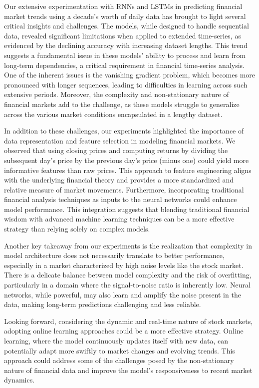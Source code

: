 \documentclass[10pt,twocolumn,letterpaper]{article}
\begin{document}
Our extensive experimentation with RNNs and LSTMs in predicting financial market trends using a decade's worth of daily data has brought to light several critical insights and challenges. The models, while designed to handle sequential data, revealed significant limitations when applied to extended time-series, as evidenced by the declining accuracy with increasing dataset lengths. This trend suggests a fundamental issue in these models' ability to process and learn from long-term dependencies, a critical requirement in financial time-series analysis. One of the inherent issues is the vanishing gradient problem, which becomes more pronounced with longer sequences, leading to difficulties in learning across such extensive periods. Moreover, the complexity and non-stationary nature of financial markets add to the challenge, as these models struggle to generalize across the various market conditions encapsulated in a lengthy dataset.

In addition to these challenges, our experiments highlighted the importance of data representation and feature selection in modeling financial markets. We observed that using closing prices and computing returns by dividing the subsequent day's price by the previous day's price (minus one) could yield more informative features than raw prices. This approach to feature engineering aligns with the underlying financial theory and provides a more standardized and relative measure of market movements. Furthermore, incorporating traditional financial analysis techniques as inputs to the neural networks could enhance model performance. This integration suggests that blending traditional financial wisdom with advanced machine learning techniques can be a more effective strategy than relying solely on complex models.

Another key takeaway from our experiments is the realization that complexity in model architecture does not necessarily translate to better performance, especially in a market characterized by high noise levels like the stock market. There is a delicate balance between model complexity and the risk of overfitting, particularly in a domain where the signal-to-noise ratio is inherently low. Neural networks, while powerful, may also learn and amplify the noise present in the data, making long-term predictions challenging and less reliable.

Looking forward, considering the dynamic and real-time nature of stock markets, adopting online learning approaches could be a more effective strategy. Online learning, where the model continuously updates itself with new data, can potentially adapt more swiftly to market changes and evolving trends. This approach could address some of the challenges posed by the non-stationary nature of financial data and improve the model's responsiveness to recent market dynamics.
\end{document}
